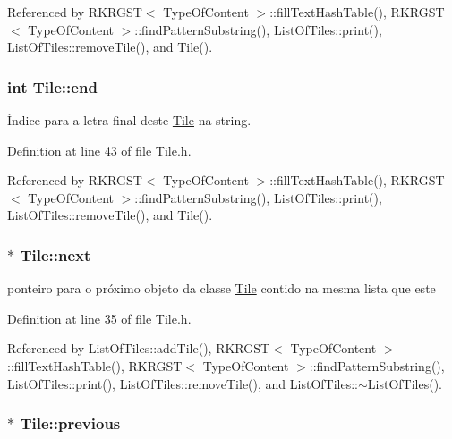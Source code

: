 Referenced by R\+K\+R\+G\+S\+T$<$ Type\+Of\+Content $>$\+::fill\+Text\+Hash\+Table(), R\+K\+R\+G\+S\+T$<$ Type\+Of\+Content $>$\+::find\+Pattern\+Substring(), List\+Of\+Tiles\+::print(), List\+Of\+Tiles\+::remove\+Tile(), and Tile().

\hypertarget{classTile_a39ee840ddb65bf9ad1fb12667e92993c}{
\subsubsection[{end}]{\setlength{\rightskip}{0pt plus 5cm}int Tile\+::end}}\label{classTile_a39ee840ddb65bf9ad1fb12667e92993c}


Índice para a letra final deste \hyperlink{classTile}{Tile} na string. 



Definition at line 43 of file Tile.\+h.



Referenced by R\+K\+R\+G\+S\+T$<$ Type\+Of\+Content $>$\+::fill\+Text\+Hash\+Table(), R\+K\+R\+G\+S\+T$<$ Type\+Of\+Content $>$\+::find\+Pattern\+Substring(), List\+Of\+Tiles\+::print(), List\+Of\+Tiles\+::remove\+Tile(), and Tile().

\hypertarget{classTile_a3c9f5e6070368625c8bfc8b9d30282ca}{
\subsubsection[{next}]{$\ast$ Tile\+::next}}\label{classTile_a3c9f5e6070368625c8bfc8b9d30282ca}


ponteiro para o próximo objeto da classe \hyperlink{classTile}{Tile} contido na mesma lista que este 



Definition at line 35 of file Tile.\+h.



Referenced by List\+Of\+Tiles\+::add\+Tile(), R\+K\+R\+G\+S\+T$<$ Type\+Of\+Content $>$\+::fill\+Text\+Hash\+Table(), R\+K\+R\+G\+S\+T$<$ Type\+Of\+Content $>$\+::find\+Pattern\+Substring(), List\+Of\+Tiles\+::print(), List\+Of\+Tiles\+::remove\+Tile(), and List\+Of\+Tiles\+::$\sim$\+List\+Of\+Tiles().

\hypertarget{classTile_ac5e5e631733d14196575bd39d5df8923}{
\subsubsection[{previous}]{$\ast$ Tile\+::previous}}\label{classTile_ac5e5e631733d14196575bd39d5df8923}


